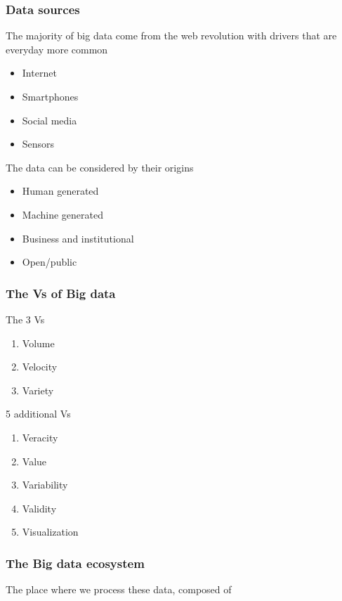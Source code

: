\subsubsection{Data sources}

The majority of big data come from the web revolution with drivers that are everyday more common

\begin{itemize}
    \item Internet
    \item Smartphones
    \item Social media
    \item Sensors
\end{itemize}

The data can be considered by their origins

\begin{itemize}
    \item Human generated
    \item Machine generated
    \item Business and institutional
    \item Open/public
\end{itemize}

\subsubsection{The Vs of Big data}

The 3 Vs

\begin{enumerate}
    \item Volume
    \item Velocity 
    \item Variety 
\end{enumerate}

5 additional Vs
\begin{enumerate}
    \item Veracity
    \item Value
    \item Variability
    \item Validity
    \item Visualization
\end{enumerate}


\subsubsection{The Big data ecosystem}

The place where we process these data, composed of

